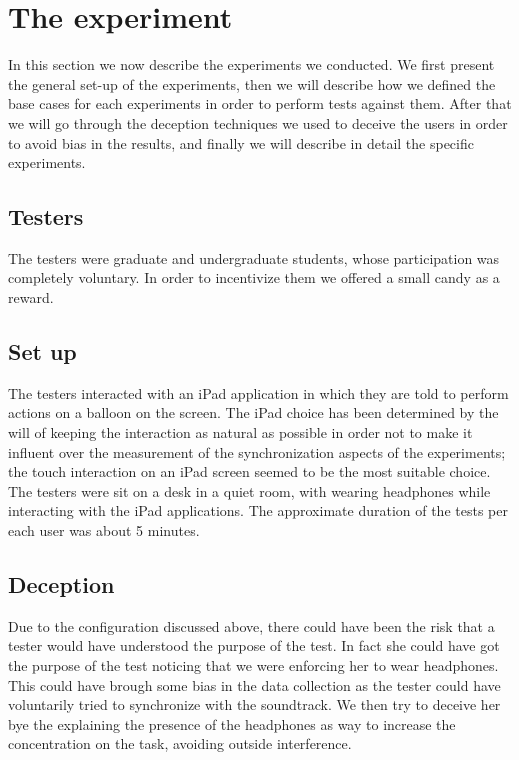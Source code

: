 \section{The experiment}
In this section we now describe the experiments we conducted.
We first present the general set-up of the experiments, then we will describe how we defined the base cases for each experiments in order to perform tests against them.
After that we will go through the deception techniques we used to deceive the users in order to avoid bias in the results, and finally we will describe in detail the specific experiments. 

\subsection{Testers}
The testers were graduate and undergraduate students, whose participation was completely voluntary. In order to incentivize them we offered a small candy as a reward.

\subsection{Set up}
The testers interacted with an iPad application in which they are told to perform actions on a balloon on the screen. The iPad choice has been determined by the will of keeping the interaction as natural as possible in order not to make it influent over the measurement of the synchronization aspects of the experiments; the touch interaction on an iPad screen seemed to be the most suitable choice.
The testers were sit on a desk in a quiet room, with wearing headphones while interacting with the iPad applications.
The approximate duration of the tests per each user was about 5 minutes.

\subsection{Deception}
Due to the configuration discussed above, there could have been the risk that a tester would have understood the purpose of the test. In fact she could have got the purpose of the test noticing that we were enforcing her to wear headphones. This could have brough some bias in the data collection as the tester could have voluntarily tried to synchronize with the soundtrack.
We then try to deceive her bye the explaining the presence of the headphones as way to increase the concentration on the task, avoiding outside interference.

